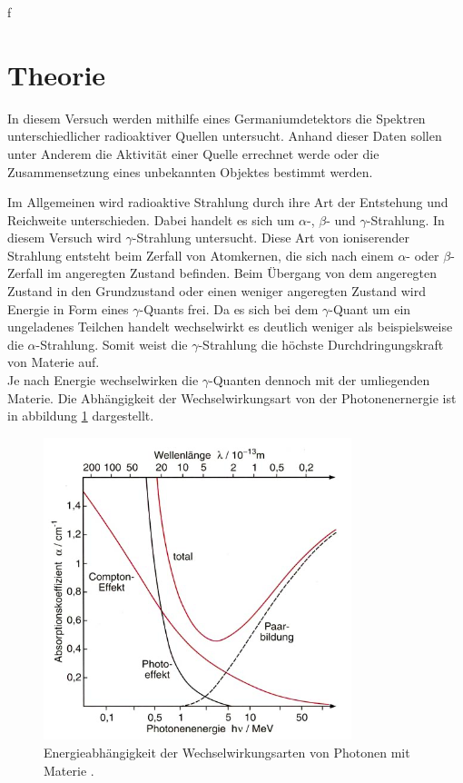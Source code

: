 f\section{Theorie}
In diesem Versuch werden mithilfe eines Germaniumdetektors die Spektren
unterschiedlicher radioaktiver Quellen untersucht. Anhand dieser Daten sollen unter Anderem
die Aktivität einer Quelle errechnet werde oder die Zusammensetzung eines unbekannten Objektes bestimmt 
werden. 

Im Allgemeinen wird radioaktive Strahlung durch ihre Art der Entstehung und Reichweite unterschieden. 
Dabei handelt es sich um $\alpha$-, $\beta$- und $\gamma$-Strahlung. In diesem Versuch wird $\gamma$-Strahlung
untersucht. Diese Art von ioniserender Strahlung entsteht beim Zerfall von Atomkernen, die sich nach einem $\alpha$- oder 
$\beta$-Zerfall im angeregten Zustand befinden. Beim Übergang von dem angeregten Zustand in den Grundzustand oder einen
weniger angeregten Zustand wird Energie in Form eines $\gamma$-Quants frei. Da es sich bei dem $\gamma$-Quant um ein 
ungeladenes Teilchen handelt wechselwirkt es deutlich weniger als beispielsweise die $\alpha$-Strahlung. Somit weist die 
$\gamma$-Strahlung die höchste Durchdringungskraft von Materie auf. \\
Je nach Energie wechselwirken die $\gamma$-Quanten dennoch mit der umliegenden Materie. 
Die Abhängigkeit der Wechselwirkungsart von der Photonenernergie ist in abbildung \ref{fig:WW}
dargestellt.
\begin{figure}[H]
    \centering
    \includegraphics[width=0.8\textwidth]{WW.png}
    \caption{Energieabhängigkeit der Wechselwirkungsarten von Photonen mit Materie \cite{WW}.}
    \label{fig:WW}
\end{figure} \noindent
